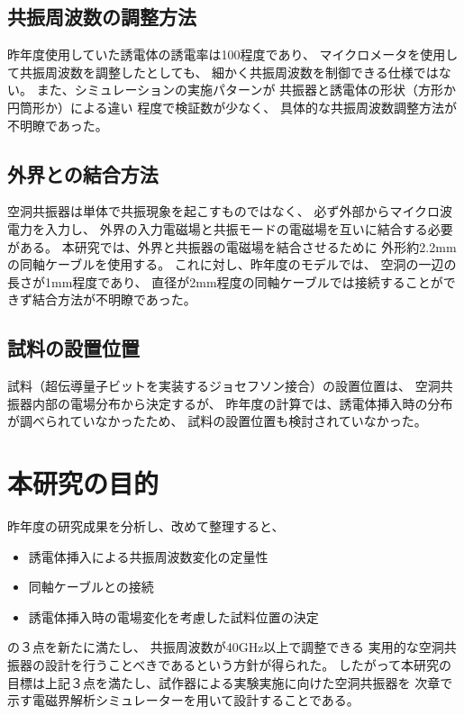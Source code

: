 \subsection*{共振周波数の調整方法}
昨年度使用していた誘電体の誘電率は100程度であり、
マイクロメータを使用して共振周波数を調整したとしても、
細かく共振周波数を制御できる仕様ではない。
また、シミュレーションの実施パターンが
共振器と誘電体の形状（方形か円筒形か）による違い
程度で検証数が少なく、
具体的な共振周波数調整方法が不明瞭であった。

\subsection*{外界との結合方法}
空洞共振器は単体で共振現象を起こすものではなく、
必ず外部からマイクロ波電力を入力し、
外界の入力電磁場と共振モードの電磁場を互いに結合する必要がある。
本研究では、外界と共振器の電磁場を結合させるために
外形約2.2mmの同軸ケーブルを使用する。
これに対し、昨年度のモデルでは、
空洞の一辺の長さが1mm程度であり、
直径が2mm程度の同軸ケーブルでは接続することができず結合方法が不明瞭であった。

\subsection*{試料の設置位置}
試料（超伝導量子ビットを実装するジョセフソン接合）の設置位置は、
空洞共振器内部の電場分布から決定するが、
昨年度の計算では、誘電体挿入時の分布が調べられていなかったため、
試料の設置位置も検討されていなかった。

\section{本研究の目的}
昨年度の研究成果を分析し、改めて整理すると、

\begin{itemize}
  \item 誘電体挿入による共振周波数変化の定量性
  \item 同軸ケーブルとの接続
  \item 誘電体挿入時の電場変化を考慮した試料位置の決定
\end{itemize}

の３点を新たに満たし、
共振周波数が40GHz以上で調整できる
実用的な空洞共振器の設計を行うことべきであるという方針が得られた。
したがって本研究の目標は上記３点を満たし、試作器による実験実施に向けた空洞共振器を
次章で示す電磁界解析シミュレーターを用いて設計することである。
